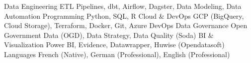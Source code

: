 \begin{cvskills}
  \cvskill
    {Data Engineering}
    {ETL Pipelines, dbt, Airflow, Dagster, Data Modeling, Data Automation}
  \cvskill
    {Programming}
    {Python, SQL, R}
  \cvskill
    {Cloud \& DevOps}
    {GCP (BigQuery, Cloud Storage), Terraform, Docker, Git, Azure DevOps}
  \cvskill
    {Data Governance}
    {Open Government Data (OGD), Data Strategy, Data Quality (Soda)}
  \cvskill
    {BI \& Visualization}
    {Power BI, Evidence, Datawrapper, Huwise (Opendatasoft)}
  \cvskill
    {Languages}
    {French (Native), German (Professional), English (Professional)}
\end{cvskills}
